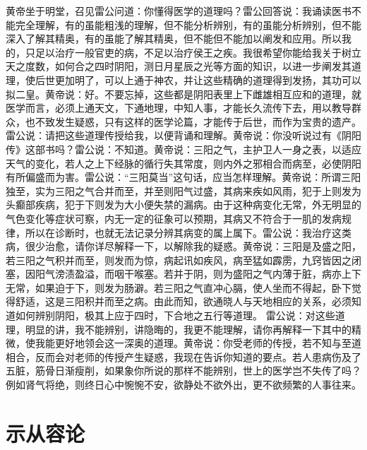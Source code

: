 \documentclass[12pt,UTF8]{ctexbook}
\begin{document}
黄帝坐于明堂，召见雷公问道：你懂得医学的道理吗？雷公回答说：我诵读医书不能完全理解，有的虽能粗浅的理解，但不能分析辨别，有的虽能分析辨别，但不能深入了解其精奥，有的虽能了解其精奥，但不能但不能加以阐发和应用。所以我的，只足以治疗一般官吏的病，不足以治疗侯王之疾。我很希望你能给我关于树立天之度数，如何合之四时阴阳，测日月星辰之光等方面的知识，以进一步阐发其道理，使后世更加明了，可以上通于神农，并让这些精确的道理得到发扬，其功可以拟二皇。黄帝说：好。不要忘掉，这些都是阴阳表里上下雌雄相互应和的道理，就医学而言，必须上通天文，下通地理，中知人事，才能长久流传下去，用以教导群众，也不致发生疑惑，只有这样的医学论篇，才能传于后世，而作为宝贵的遗产。
雷公说：请把这些道理传授给我，以便背诵和理解。黄帝说：你没听说过有《阴阳传》这部书吗？雷公说：不知道。黄帝说：三阳之气，主护卫人一身之表，以适应天气的变化，若人之上下经脉的循行失其常度，则内外之邪相合而病至，必使阴阳有所偏盛而为害。雷公说：“三阳莫当”这句话，应当怎样理解。黄帝说：所谓三阳独至，实为三阳之气合并而至，并至则阳气过盛，其病来疾如风雨，犯于上则发为头癫部疾病，犯于下则发为大小便失禁的漏病。由于这种病变化无常，外无明显的气色变化等症状可察，内无一定的征象可以预期，其病又不符合于一肌的发病规律，所以在诊断时，也就无法记录分辨其病变的属上属下。雷公说：我治疗这类病，很少治愈，请你详尽解释一下，以解除我的疑惑。黄帝说：三阳是及盛之阳，若三阳之气积并而至，则发而为惊，病起讯如疾风，病至猛如霹雳，九窍皆因之闭塞，因阳气滂渍盈溢，而咽干喉塞。若并于阴，则为盛阳之气内薄于脏，病亦上下无常，如果迫于下，则发为肠澼。若三阳之气直冲心膈，使人坐而不得起，卧下觉得舒适，这是三阳积并而至之病。由此而知，欲通晓人与天地相应的关系，必须知道如何辨别阴阳，极其上应于四时，下合地之五行等道理。
雷公说：对这些道理，明显的讲，我不能辨别，讲隐晦的，我更不能理解，请你再解释一下其中的精微，使我能更好地领会这一深奥的道理。黄帝说：你受老师的传授，若不知与至道相合，反而会对老师的传授产生疑惑，我现在告诉你知道的要点。若人患病伤及了五脏，筋骨日渐瘦削，如果象你所说的那样不能辨别，世上的医学岂不失传了吗？例如肾气将绝，则终日心中惋惋不安，欲静处不欲外出，更不欲频繁的人事往来。

\chapter{示从容论}
\end{document}
